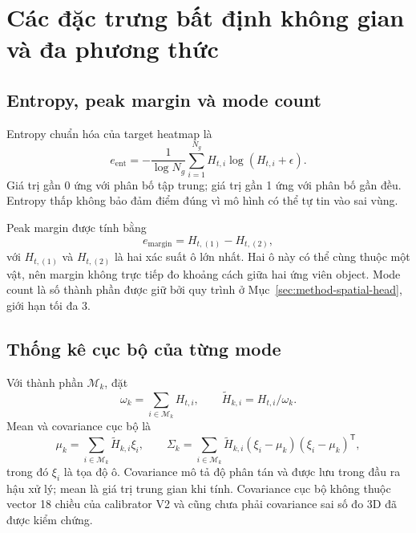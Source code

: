 \section{Các đặc trưng bất định không gian và đa phương thức}
\label{sec:method-uncertainty-features}

\subsection{Entropy, peak margin và mode count}

Entropy chuẩn hóa của target heatmap là
\begin{equation}
    e_{\mathrm{ent}}=
    -\frac{1}{\log N_g}
    \sum_{i=1}^{N_g}H_{t,i}\log(H_{t,i}+\epsilon).
    \label{eq:method-normalized-entropy}
\end{equation}
Giá trị gần 0 ứng với phân bố tập trung; giá trị gần 1 ứng với
phân bố gần đều. Entropy thấp không bảo đảm điểm đúng vì mô hình
có thể tự tin vào sai vùng.

Peak margin được tính bằng
\begin{equation}
    e_{\mathrm{margin}}=H_{t,(1)}-H_{t,(2)},
\end{equation}
với $H_{t,(1)}$ và $H_{t,(2)}$ là hai xác suất ô lớn nhất.
Hai ô này có thể cùng thuộc một vật, nên margin không trực tiếp
đo khoảng cách giữa hai ứng viên object.
Mode count là số thành phần được giữ bởi quy trình ở
Mục~\ref{sec:method-spatial-head}, giới hạn tối đa 3.

\subsection{Thống kê cục bộ của từng mode}

Với thành phần $\mathcal{M}_k$, đặt
\begin{equation}
    \omega_k=\sum_{i\in\mathcal{M}_k}H_{t,i},\qquad
    \widetilde{H}_{k,i}=H_{t,i}/\omega_k.
\end{equation}
Mean và covariance cục bộ là
\begin{equation}
    \mu_k=\sum_{i\in\mathcal{M}_k}\widetilde{H}_{k,i}\xi_i,\qquad
    \Sigma_k=\sum_{i\in\mathcal{M}_k}
    \widetilde{H}_{k,i}(\xi_i-\mu_k)(\xi_i-\mu_k)^{\mathsf T},
\end{equation}
trong đó $\xi_i$ là tọa độ ô. Covariance mô tả độ phân tán và được
lưu trong đầu ra hậu xử lý; mean là giá trị trung gian khi tính.
Covariance cục bộ không thuộc
vector 18 chiều của calibrator V2 và cũng chưa phải covariance
sai số đo 3D đã được kiểm chứng.

